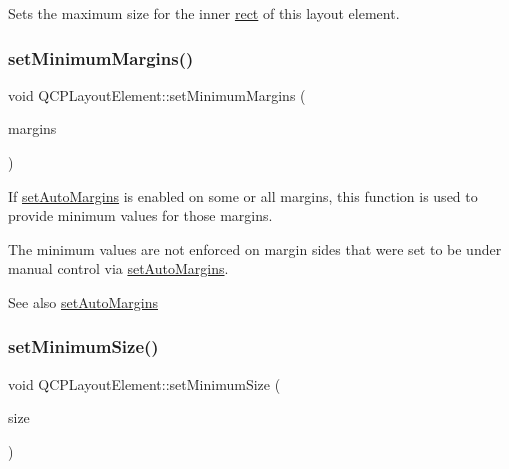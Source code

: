 Sets the maximum size for the inner \hyperlink{class_q_c_p_layout_element_a208effccfe2cca4a0eaf9393e60f2dd4}{rect} of this layout element. \hypertarget{class_q_c_p_layout_element_a0a8a17abc16b7923159fcc7608f94673}{}\label{class_q_c_p_layout_element_a0a8a17abc16b7923159fcc7608f94673} 
\subsubsection{\texorpdfstring{set\+Minimum\+Margins()}{setMinimumMargins()}}
{\footnotesize\ttfamily void Q\+C\+P\+Layout\+Element\+::set\+Minimum\+Margins (\begin{DoxyParamCaption}\item[{const Q\+Margins \&}]{margins }\end{DoxyParamCaption})}

If \hyperlink{class_q_c_p_layout_element_accfda49994e3e6d51ed14504abf9d27d}{set\+Auto\+Margins} is enabled on some or all margins, this function is used to provide minimum values for those margins.

The minimum values are not enforced on margin sides that were set to be under manual control via \hyperlink{class_q_c_p_layout_element_accfda49994e3e6d51ed14504abf9d27d}{set\+Auto\+Margins}.

\begin{DoxySeeAlso}{See also}
\hyperlink{class_q_c_p_layout_element_accfda49994e3e6d51ed14504abf9d27d}{set\+Auto\+Margins} 
\end{DoxySeeAlso}
\hypertarget{class_q_c_p_layout_element_a5dd29a3c8bc88440c97c06b67be7886b}{}\label{class_q_c_p_layout_element_a5dd29a3c8bc88440c97c06b67be7886b} 
\subsubsection{\texorpdfstring{set\+Minimum\+Size()}{setMinimumSize()}\hspace{0.1cm}{\footnotesize\ttfamily [1/2]}}
{\footnotesize\ttfamily void Q\+C\+P\+Layout\+Element\+::set\+Minimum\+Size (\begin{DoxyParamCaption}\item[{const Q\+Size \&}]{size }\end{DoxyParamCaption})}

